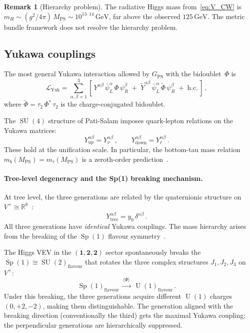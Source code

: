 \documentclass[12pt,a4paper]{article}
\theoremstyle{definition}
\newtheorem{remark}[theorem]{Remark}
\newcommand{\SU}{\operatorname{SU}}
\newcommand{\Sp}{\operatorname{Sp}}
\newcommand{\U}{\operatorname{U}}
\newcommand{\R}{\mathbb{R}}
\newcommand{\MPS}{M_{\mathrm{PS}}}
\begin{document}
\begin{remark}[Hierarchy problem]
The radiative Higgs mass from~\eqref{eq:V_CW} is $m_H \sim (g^2/4\pi)\, \MPS \sim 10^{13\text{--}14}\,\mathrm{GeV}$, far above the observed $125\,\mathrm{GeV}$.
The metric bundle framework does not resolve the hierarchy problem.
\end{remark}

\subsection{Yukawa couplings}

The most general Yukawa interaction allowed by $G_{\mathrm{PS}}$ with the bidoublet~$\Phi$ is
\begin{equation}
\label{eq:L_yuk}
\mathcal{L}_{\mathrm{Yuk}} = \sum_{\alpha,\beta=1}^{3} \left[\,
Y^{\alpha\beta}\, \bar{\psi}^\alpha_L\, \Phi\, \psi^\beta_R
\;+\;
\tilde{Y}^{\alpha\beta}\, \bar{\psi}^\alpha_L\, \tilde{\Phi}\, \psi^\beta_R
\;+\; \mathrm{h.c.}
\,\right]\,,
\end{equation}
where $\tilde{\Phi} = \tau_2\, \Phi^*\, \tau_2$ is the charge-conjugated bidoublet.

The $\SU(4)$ structure of Pati-Salam imposes quark-lepton relations on the Yukawa matrices:
\begin{equation}
\label{eq:SU4_Yukawa}
Y^{\alpha\beta}_{\mathrm{up}} = Y^{\alpha\beta}_\nu\,, \qquad
Y^{\alpha\beta}_{\mathrm{down}} = Y^{\alpha\beta}_{\ell}\,.
\end{equation}
These hold at the unification scale.
In particular, the bottom-tau mass relation $m_b(\MPS) = m_\tau(\MPS)$ is a zeroth-order prediction~\cite{PatiSalam1974}.

\paragraph{Tree-level degeneracy and the Sp(1) breaking mechanism.}
At tree level, the three generations are related by the quaternionic structure on $V^+ \cong \R^6$~\cite{Paper5}:
\begin{equation}
Y^{\alpha\beta}_{\mathrm{tree}} = y_0\, \delta^{\alpha\beta}\,.
\end{equation}
All three generations have \emph{identical} Yukawa couplings.
The mass hierarchy arises from the breaking of the $\Sp(1)$ flavour symmetry~\cite{Paper5}.

The Higgs VEV in the $(\mathbf{1},\mathbf{2},\mathbf{2})$ sector spontaneously breaks the $\Sp(1) \cong \SU(2)_{\mathrm{flavour}}$ that rotates the three complex structures $J_1, J_2, J_3$ on $V^+$:
\begin{equation}
\Sp(1)_{\mathrm{flavour}} \;\xrightarrow{\langle\Phi\rangle}\; \U(1)_{\mathrm{flavour}}\,.
\end{equation}
Under this breaking, the three generations acquire different $\U(1)$ charges $(0, +2, -2)$, making them distinguishable.
The generation aligned with the breaking direction (conventionally the third) gets the maximal Yukawa coupling; the perpendicular generations are hierarchically suppressed.
\end{document}
